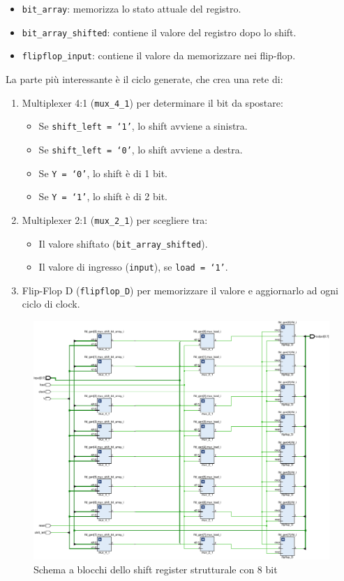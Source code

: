 \begin{itemize}
    \item \texttt{bit\_array}: memorizza lo stato attuale del registro.
    \item \texttt{bit\_array\_shifted}: contiene il valore del registro dopo lo shift.
    \item \texttt{flipflop\_input}: contiene il valore da memorizzare nei flip-flop.
\end{itemize}

La parte più interessante è il ciclo generate, che crea una rete di:

\begin{enumerate}
    \item Multiplexer 4:1 (\texttt{mux\_4\_1}) per determinare il bit da spostare:
    \begin{itemize}
        \item Se \texttt{shift\_left = `1'}, lo shift avviene a sinistra.
        \item Se \texttt{shift\_left = `0'}, lo shift avviene a destra.
        \item Se \texttt{Y = `0'}, lo shift è di 1 bit.
        \item Se \texttt{Y = `1'}, lo shift è di 2 bit.
    \end{itemize}
    \item Multiplexer 2:1 (\texttt{mux\_2\_1}) per scegliere tra:
    \begin{itemize}
        \item Il valore shiftato (\texttt{bit\_array\_shifted}).
        \item Il valore di ingresso (\texttt{input}), se \texttt{load = `1'}.
    \end{itemize}
    \item Flip-Flop D (\texttt{flipflop\_D}) per memorizzare il valore e aggiornarlo ad ogni ciclo di clock.
\end{enumerate}

\begin{figure}[h]
    \centering
    \includegraphics[width=\textwidth]{img/4_1_SHIFTREGISTER_STRUCTURAL.pdf}
    \caption{Schema a blocchi dello shift register strutturale con 8 bit}
    \label{fig:4_1_SHIFTREGISTER_STRUCTURAL}
\end{figure}

